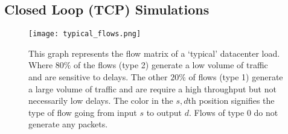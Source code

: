 \documentclass{IEEEtran}%
\begin{document}




\subsection{Closed Loop (TCP) Simulations}
\begin{figure}%
	 \texttt{[image: typical\_flows.png]}
	\caption{This graph represents the flow matrix of a `typical' datacenter load.  Where $80\%$ of the flows (type 2) generate a low volume of traffic and are sensitive to delays.  The other $20\%$ of flows (type 1) generate a large volume of traffic and are require a high throughput but not necessarily low delays.  The color in the $s,d$th position signifies the type of flow going from input $s$ to output $d$.  Flows of type $0$ do not generate any packets.} 	
	\label{typical_flows}
\end{figure}
%
\end{document}
